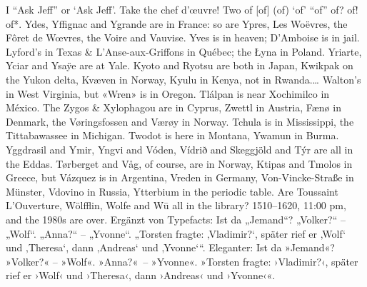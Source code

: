 \documentclass[11pt,letterpaper,twoside,openany]{book}
\begin{document}
\noindent\Large\color{black} I “Ask Jeff” or ‘Ask Jeff’. Take the chef d’œuvre! Two of [of] (of) ‘of’ “of” of? of! of*. Ydes, Yffignac and Ygrande are in France: so are Ypres, Les Woëvres, the Fôret de Wœvres, the Voire and Vauvise. Yves is in heaven; D’Amboise is in jail. Lyford’s in Texas \& L’Anse-aux-Griffons in Québec; the Łyna in Poland. Yriarte, Yciar and Ysaÿe are at Yale. Kyoto and Ryotsu are both in Japan, Kwikpak on the Yukon delta, Kvæven in Norway, Kyulu in Kenya, not in Rwanda.… Walton’s in West Virginia, but «Wren» is in Oregon. Tlálpan is near Xochimilco in México. The Zygos \& Xylophagou are in Cyprus, Zwettl in Austria, Fænø in Denmark, the Vøringsfossen and Værøy in Norway. Tchula is in Mississippi, the Tittabawassee in Michigan. Twodot is here in Montana, Ywamun in Burma. Yggdrasil and Ymir, Yngvi and Vóden, Vídrið and Skeggjöld and Týr are all in the Eddas. Tørberget and Våg, of course, are in Norway, Ktipas and Tmolos in Greece, but Vázquez is in Argentina, Vreden in Germany, Von-Vincke-Straße in Münster, Vdovino in Russia, Ytterbium in the periodic table. Are Toussaint L’Ouverture, Wölfflin, Wolfe %
and Wū %
 all in the library?
1510–1620, 11:00 pm, and the 1980s are over. 
Ergänzt von Typefacts: 
Ist da „Jemand“? „Volker?“ – „Wolf“. „Anna?“ – „Yvonne“. „Torsten fragte: ‚Vladimir?‘, später rief er ‚Wolf‘ und ‚Theresa‘, dann ‚Andreas‘ und ‚Yvonne‘“. Eleganter: Ist da »Jemand«? »Volker?« – »Wolf«. »Anna?« – »Yvonne«. »Torsten fragte: ›Vladimir?‹, später rief er ›Wolf‹ und ›Theresa‹, dann ›Andreas‹ und ›Yvonne‹«.
\end{document}
